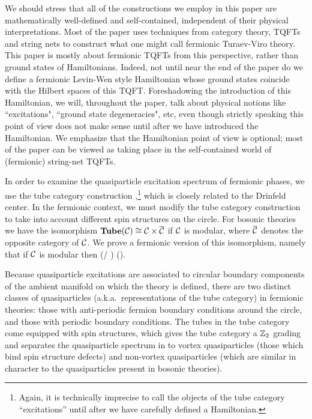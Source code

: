 We should stress that all of the constructions we employ in this paper are mathematically well-defined and 
self-contained, independent of their physical interpretations. 
Most of the paper uses techniques from category theory, TQFTs and string nets to construct what one
might call fermionic Turaev-Viro theory.
This paper is mostly about fermionic TQFTs from this perspective, 
rather than ground states of Hamiltonians. 
Indeed, not until near the end of the paper do we define a fermionic Levin-Wen style Hamiltonian whose ground states coincide with 
the Hilbert spaces of this TQFT.
Foreshadowing the introduction of this Hamiltonian, we will, throughout the paper, talk about physical notions like ``excitations", ``ground state degeneracies", 
etc, even though
strictly speaking this point of view does not make sense until after we have introduced the Hamiltonian.
We emphasize that the Hamiltonian point of view is optional; most of the paper can be viewed as taking place
in the self-contained world of (fermionic) string-net TQFTs.

In order to examine the quasiparticle excitation spectrum of fermionic phases, 
we use the tube category construction \cite{ocneanu1994},\footnote{
Again, it is technically imprecise to call the objects of the tube category ``excitations'' until after we have carefully defined a Hamiltonian.}
which is closely related to the Drinfeld center. 
In the fermionic context, we must modify the tube category construction to take into account different spin structures on the circle.
For bosonic theories we have the isomorphism $\textbf{Tube}(\mathcal{C})\cong\mathcal{C}\times\overline{\mathcal{C}}$ \cite{muger2003b} if $\mathcal{C}$ is modular, where $\overline{\mathcal{C}}$ denotes the opposite category of $\mathcal{C}$.
We prove a fermionic version of this isomorphism, namely that 
if $\mathcal{C}$ is modular then 
\be 
	\tube(\mcc / \psi) \cong \mcc \times (\overline{\mcc / \psi}).
\ee

Because quasiparticle excitations are associated to circular boundary components of the ambient 
manifold on which the theory is defined, there are two distinct classes of quasiparticles (a.k.a.\ representations of the tube category) in 
fermionic theories: those with anti-periodic fermion boundary conditions around the circle, and 
those with periodic boundary conditions. 
The tubes in the tube category come equipped with spin structures, which gives the tube category a $\mathbb{Z}_2$ grading
and separates the quasiparticle spectrum in to vortex quasiparticles (those which bind spin structure defects) 
and non-vortex quasiparticles (which are similar in character to the quasiparticles present in bosonic theories). 

